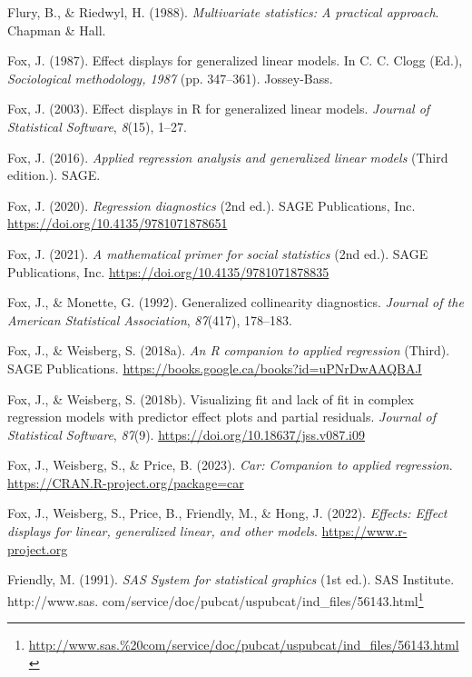 \documentclass[
  letterpaper,
  10pt,
  krantz2]{krantz}
\newlength{\cslhangindent}
\newenvironment{CSLReferences}[2] %
 {\begin{list}{}{%
  \setlength{\itemindent}{0pt}
  \setlength{\leftmargin}{0pt}
  \setlength{\parsep}{0pt}
  \ifodd #1
   \setlength{\leftmargin}{\cslhangindent}
   \setlength{\itemindent}{-1\cslhangindent}
  \fi
  \setlength{\itemsep}{#2\baselineskip}}}
 {\end{list}}
\providecommand{\href}[2]{#2\footnote{\url{#1}}}
\begin{document}
\begin{CSLReferences}{1}{0}
Flury, B., \& Riedwyl, H. (1988). \emph{Multivariate statistics: A
practical approach}. Chapman \& Hall.

Fox, J. (1987). Effect displays for generalized linear models. In C. C.
Clogg (Ed.), \emph{Sociological methodology, 1987} (pp. 347--361).
Jossey-Bass.

Fox, J. (2003). Effect displays in {R} for generalized linear models.
\emph{Journal of Statistical Software}, \emph{8}(15), 1--27.

Fox, J. (2016). \emph{Applied regression analysis and generalized linear
models} (Third edition.). SAGE.

Fox, J. (2020). \emph{Regression diagnostics} (2nd ed.). {SAGE}
Publications, Inc. \url{https://doi.org/10.4135/9781071878651}

Fox, J. (2021). \emph{A mathematical primer for social statistics} (2nd
ed.). SAGE Publications, Inc.
\url{https://doi.org/10.4135/9781071878835}

Fox, J., \& Monette, G. (1992). Generalized collinearity diagnostics.
\emph{Journal of the American Statistical Association}, \emph{87}(417),
178--183.

Fox, J., \& Weisberg, S. (2018a). \emph{An {R} companion to applied
regression} (Third). SAGE Publications.
\url{https://books.google.ca/books?id=uPNrDwAAQBAJ}

Fox, J., \& Weisberg, S. (2018b). Visualizing fit and lack of fit in
complex regression models with predictor effect plots and partial
residuals. \emph{Journal of Statistical Software}, \emph{87}(9).
\url{https://doi.org/10.18637/jss.v087.i09}

Fox, J., Weisberg, S., \& Price, B. (2023). \emph{Car: Companion to
applied regression}. \url{https://CRAN.R-project.org/package=car}

Fox, J., Weisberg, S., Price, B., Friendly, M., \& Hong, J. (2022).
\emph{Effects: Effect displays for linear, generalized linear, and other
models}. \url{https://www.r-project.org}

Friendly, M. (1991). \emph{{SAS System} for statistical graphics} (1st
ed.). SAS Institute.
\href{http://www.sas.\%20com/service/doc/pubcat/uspubcat/ind_files/56143.html}{http://www.sas.
com/service/doc/pubcat/uspubcat/ind\_files/56143.html}


\end{CSLReferences}
\end{document}
